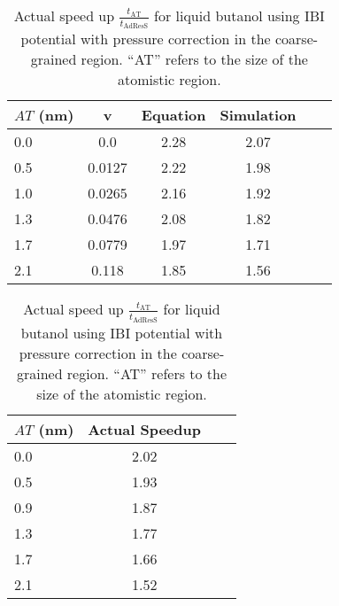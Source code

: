\documentclass[a4paper,preprint,unsortedaddress]{revtex4-1}
\begin{document}
\begin{table}[htb]
\centering
\begin{minipage}{0.48\textwidth}
\sffamily
\begin{tabular}{l*{5}{c}}
\toprule
\hline \hline
 \bfseries $AT$ (nm) & \bfseries v & \bfseries Equation & \bfseries Simulation \\
\midrule
\hline \hline
0.0 & 0.0 & 2.28 & 2.07\\
0.5 & 0.0127 & 2.22 & 1.98\\
1.0 & 0.0265 & 2.16 & 1.92\\
1.3 & 0.0476 & 2.08 & 1.82\\
1.7 & 0.0779 & 1.97 & 1.71\\
2.1 & 0.118 & 1.85 & 1.56\\ \bottomrule
\hline \hline
\end{tabular}
\caption{Comparison of speed up for liquid butanol using IBI potential with pressure correction in the coarse-grained region, calculated using Eq. 9 and from AdResS simulation.}
\label{butanol}
\end{minipage}%
\hfill
\begin{minipage}{0.48\textwidth}
\centering
\sffamily
\begin{tabular}{l*{3}{c}}
\toprule
\hline \hline
 \bfseries $AT$ (nm) & \bfseries Actual Speedup \\
\midrule
\hline \hline
0.0 & 2.02\\
0.5 & 1.93  \\
0.9 & 1.87\\
1.3 & 1.77 \\
1.7 & 1.66\\
2.1 & 1.52\\ \bottomrule
\hline \hline
\end{tabular}
\caption{{Actual speed up $\frac{t_\text{AT}}{t_\text{AdResS}}$ for liquid butanol using IBI potential with pressure correction in the coarse-grained region. ``AT'' refers to the size of the atomistic region.}}
\label{butanol1}
\end{minipage}
\end{table}
\end{document}
